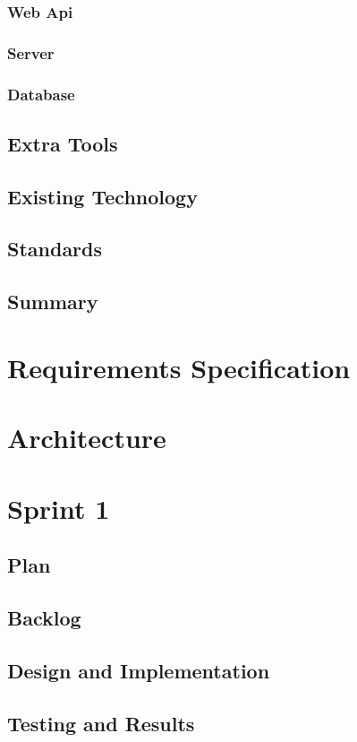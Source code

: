 \documentclass[12pt, a4paper]{article}
\begin{document}
\subsubsection{Web Api}
\subsubsection{Server}
\subsubsection{Database}
\subsection{Extra Tools}
\subsection{Existing Technology}
\subsection{Standards}
\subsection{Summary}

\section{Requirements Specification}

\section{Architecture}

\section{Sprint 1}
\subsection{Plan}
\subsection{Backlog}
\subsection{Design and Implementation}
\subsection{Testing and Results}
\end{document}
